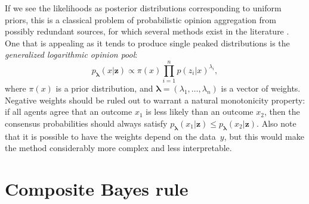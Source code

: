 \documentclass[english]{scrartcl}
\def\y{{\mathbf{y}}}
\def\y{{\mathbf{z}}}
\newcommand{\blambda}{{\boldsymbol{\lambda}}}
\begin{document}
If we see the likelihoods as posterior distributions corresponding to uniform priors, this is a classical problem of probabilistic opinion aggregation from possibly redundant sources, for which several methods exist in the literature \cite{Tarantola-82,Genest-86,Garg-04,Allard-12}. One that is appealing as it tends to produce single peaked distributions is the {\em generalized logarithmic opinion pool}:
\begin{equation}
\label{eq:log_pool}
p_\blambda(x|\y) \propto \pi(x) \prod_{i=1}^n p(z_i|x)^{\lambda_i},
\end{equation} 
where $\pi(x)$ is a prior distribution, and $\blambda=(\lambda_1,\ldots,\lambda_n)$ is a vector of weights. Negative weights should be ruled out to warrant a natural monotonicity property: if all agents agree that an outcome $x_1$ is less likely than an outcome $x_2$, then the consensus probabilities should always satisfy $p_\blambda(x_1|\y)\leq p_\blambda(x_2|\y)$. Also note that it is possible to have the weights depend on the data~$y$, but this would make the method considerably more complex and less interpretable. 







\section{Composite Bayes rule}
\label{sec:bayes_rule}
\end{document}
